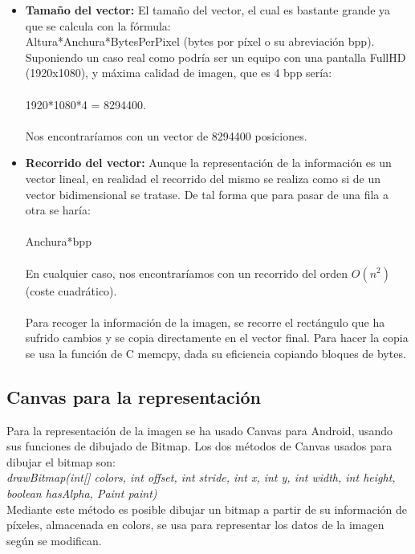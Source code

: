 \begin{itemize}
\item \textbf{Tamaño del vector:} El tamaño del vector, el cual es bastante grande ya que se calcula con la fórmula:\\
Altura*Anchura*BytesPerPixel (bytes por píxel o su abreviación bpp).\\
Suponiendo un caso real como podría ser un equipo con una pantalla FullHD (1920x1080), y máxima calidad de imagen, que es 4 bpp sería:\\
\\
1920*1080*4 = 8294400.\\
\\
Nos encontraríamos con un vector de 8294400 posiciones.
\item \textbf{Recorrido del vector:} Aunque la representación de la información es un vector lineal, en realidad el recorrido del mismo se realiza como si de un vector bidimensional se tratase. De tal forma que para pasar de una fila a otra se haría:\\
\\
Anchura*bpp\\
\\
En cualquier caso, nos encontraríamos con un recorrido del orden $O(n^2)$ (coste cuadrático).\\
\\
Para recoger la información de la imagen, se recorre el rectángulo que ha sufrido cambios y se copia directamente en el vector final. Para hacer la copia se usa la función de C memcpy, dada su eficiencia copiando bloques de bytes.\\
\end{itemize}

\subsection{Canvas para la representación}

Para la representación de la imagen se ha usado Canvas para Android, usando sus funciones de dibujado de Bitmap. Los dos métodos de Canvas usados para dibujar el bitmap son:\\

\emph{drawBitmap(int[] colors, int offset, int stride, int x, int y, int width, int height, boolean hasAlpha, Paint paint)}\\

Mediante este método es posible dibujar un bitmap a partir de su información de píxeles, almacenada en colors, se usa para representar los datos de la imagen según se modifican.\\

